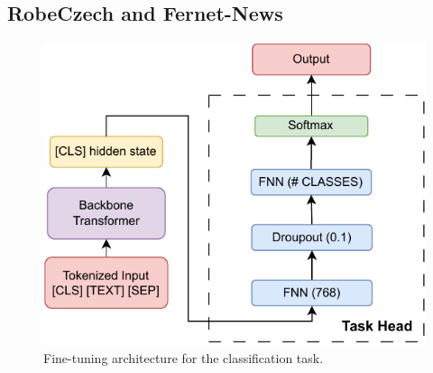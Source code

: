 \subsection{RobeCzech and Fernet-News}
\label{sec:base-models}

\begin{figure}[h]
    \centering
    \includegraphics[width=0.7\linewidth]{img/transformer/fine_tune.pdf}
    \caption{Fine-tuning architecture for the classification task.}
    \label{fig:class-tune}
\end{figure}

